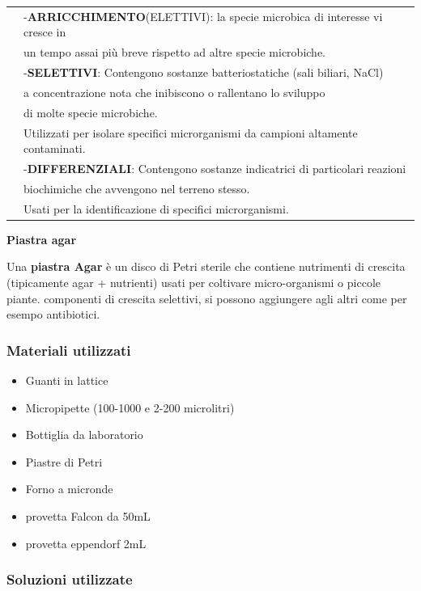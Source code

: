 \begin{tabular}{ll}
& -\textbf{ARRICCHIMENTO}(ELETTIVI): la specie microbica di interesse vi cresce in \\ \cline{1-1} & un tempo assai più breve rispetto ad altre specie microbiche.\\
& -\textbf{SELETTIVI}: Contengono sostanze batteriostatiche (sali biliari, NaCl) \\ &  a concentrazione nota che inibiscono o rallentano lo sviluppo \\ & di molte specie microbiche. \\ &  Utilizzati per isolare specifici microrganismi da campioni altamente contaminati.\\
& -\textbf{DIFFERENZIALI}: Contengono sostanze indicatrici di particolari reazioni \\ & biochimiche che avvengono nel terreno stesso. \\ & Usati per la identificazione di specifici microrganismi.\\


\end{tabular}

\textbf{Piastra agar}
\vspace{0.3cm}

Una \textbf{piastra Agar} è un disco di Petri sterile che contiene nutrimenti di crescita (tipicamente agar + nutrienti) usati per coltivare micro-organismi o piccole piante.
componenti di crescita selettivi, si possono aggiungere agli altri come per esempo antibiotici.




\subsubsection{Materiali utilizzati}

\begin{itemize}
	\item Guanti in lattice
	\item Micropipette (100-1000 e 2-200 microlitri)
	\item Bottiglia da laboratorio
  \item Piastre di Petri
	\item Forno a micronde
  \item provetta Falcon da 50mL
  \item provetta eppendorf 2mL

\end{itemize}

\subsubsection{Soluzioni utilizzate}


